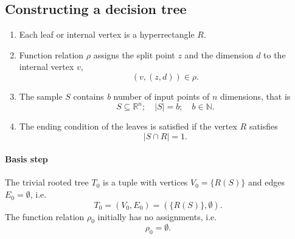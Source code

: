 \subsection{Constructing a decision tree}
\label{sec:cdt}
\begin{enumerate}

    \item Each leaf or internal vertex is a hyperrectangle $R$. 
    \item Function relation $\rho$ assigns the split point $z$ and the dimension $d$ to the internal vertex $v$,
    $$(v, (z,d)) \in \rho.$$
    \item The sample \(S\) contains \emph{b} number of input points of $n$ dimensions, that is
    $$S \subseteq \mathbb{R}^n ;\quad |S| = b; \quad b \in \mathbb{N}.$$
    \item The ending condition of the leaves is satisfied if the vertex \(R\) satisfies \[| S \cap R | = 1.\]
\end{enumerate}


\paragraph{Basis step}
The trivial rooted tree \(T_0\) is a tuple with
vertices \(V_0 = \{R(S)\}\) and edges \(E_0 = \emptyset\), i.e. 
\[T_0= (V_0, E_0) = (\{R(S)\},\emptyset).\]
The function relation $\rho_0$ initially has no assignments, i.e.
$$\rho_0 = \emptyset.$$

